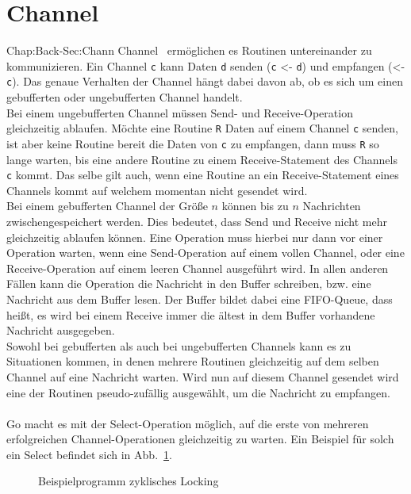 \section{Channel}{Chap:Back-Sec:Chann}
Channel~\cite{effectiveGo} ermöglichen es Routinen untereinander zu 
kommunizieren.
Ein Channel \texttt{c} kann Daten \texttt{d} senden (\texttt{c} <- \texttt{d})
und empfangen (<- \texttt{c}). Das genaue Verhalten der Channel hängt dabei 
davon ab, ob es sich um einen gebufferten oder ungebufferten Channel handelt. \\
Bei einem ungebufferten Channel müssen Send- und Receive-Operation gleichzeitig 
ablaufen. Möchte eine Routine \texttt{R} Daten auf einem Channel \texttt{c} senden, 
ist aber keine Routine bereit die Daten von \texttt{c} zu empfangen, 
dann muss \texttt{R} so lange warten, bis eine andere Routine zu einem 
Receive-Statement des Channels \texttt{c} kommt. Das selbe gilt auch, wenn 
eine Routine an ein Receive-Statement eines Channels kommt auf welchem 
momentan nicht gesendet wird.\\
Bei einem gebufferten Channel der Größe $n$ können bis zu $n$ Nachrichten
zwischengespeichert werden. Dies bedeutet, dass Send und Receive nicht mehr 
gleichzeitig ablaufen können. Eine Operation muss hierbei nur dann 
vor einer Operation warten, wenn eine Send-Operation auf einem vollen 
Channel, oder eine Receive-Operation auf einem leeren Channel ausgeführt 
wird. In allen anderen Fällen kann die Operation die Nachricht in den Buffer 
schreiben, bzw. eine Nachricht aus dem Buffer lesen. Der Buffer bildet dabei 
eine FIFO-Queue, dass heißt, es wird bei einem Receive immer die ältest in dem
Buffer vorhandene Nachricht ausgegeben.\\
Sowohl bei gebufferten als auch bei ungebufferten Channels kann es zu 
Situationen kommen, in denen mehrere Routinen gleichzeitig auf dem selben 
Channel auf eine Nachricht warten. Wird nun auf diesem Channel gesendet 
wird eine der Routinen pseudo-zufällig ausgewählt, um die Nachricht zu empfangen.\\\\
Go macht es mit der Select-Operation möglich, auf die erste von mehreren 
erfolgreichen Channel-Operationen gleichzeitig zu warten. Ein Beispiel für solch 
ein Select befindet sich in Abb.~\ref{Chan:Analyze-Sec:Channel-Fig:SelectEx}.
\begin{figure}[h!]
  
  \caption{Beispielprogramm zyklisches Locking}
  \label{Chan:Analyze-Sec:Channel-Fig:SelectEx}
\end{figure}
